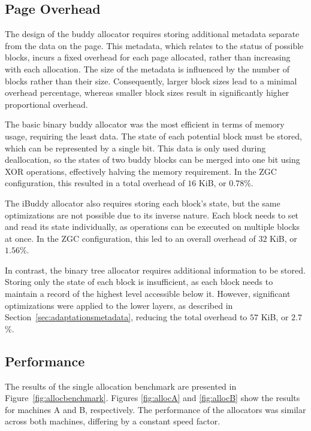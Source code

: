 
\subsection{Page Overhead}
The design of the buddy allocator requires storing additional metadata separate from the data on the page. This metadata, which relates to the status of possible blocks, incurs a fixed overhead for each page allocated, rather than increasing with each allocation. The size of the metadata is influenced by the number of blocks rather than their size. Consequently, larger block sizes lead to a minimal overhead percentage, whereas smaller block sizes result in significantly higher proportional overhead.

The basic binary buddy allocator was the most efficient in terms of memory usage, requiring the least data. The state of each potential block must be stored, which can be represented by a single bit. This data is only used during deallocation, so the states of two buddy blocks can be merged into one bit using XOR operations, effectively halving the memory requirement. In the ZGC configuration, this resulted in a total overhead of $16$ KiB, or $0.78$\%.

The iBuddy allocator also requires storing each block's state, but the same optimizations are not possible due to its inverse nature. Each block needs to set and read its state individually, as operations can be executed on multiple blocks at once. In the ZGC configuration, this led to an overall overhead of $32$ KiB, or $1.56$\%.

In contrast, the binary tree allocator requires additional information to be stored. Storing only the state of each block is insufficient, as each block needs to maintain a record of the highest level accessible below it. However, significant optimizations were applied to the lower layers, as described in Section~\ref{sec:adaptationsmetadata}, reducing the total overhead to $57$ KiB, or $2.7$\%.

\subsection{Performance}
The results of the single allocation benchmark are presented in Figure~\ref{fig:allocbenchmark}. Figures \ref{fig:allocA} and \ref{fig:allocB} show the results for machines A and B, respectively. The performance of the allocators was similar across both machines, differing by a constant speed factor.


